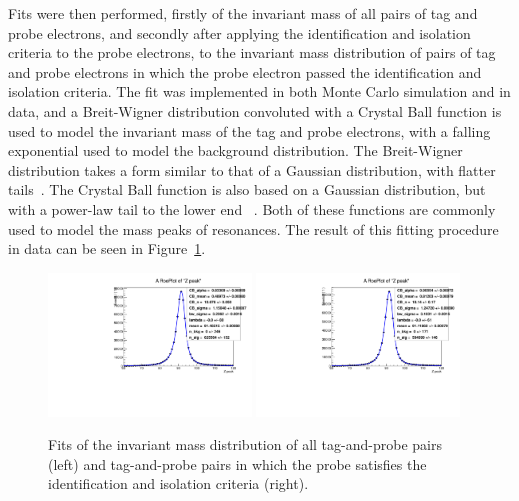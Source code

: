 Fits were then performed, firstly of the invariant mass of all pairs of tag and probe electrons, and secondly
after applying the identification and isolation criteria to the probe electrons, to the invariant mass
distribution of pairs of tag and probe electrons in which the probe electron passed the identification and
isolation criteria. The fit was implemented in both Monte Carlo simulation and in data, and a Breit-Wigner
distribution convoluted with a Crystal Ball function is used to model the invariant mass of the tag and probe
electrons, with a falling exponential used to model the background distribution. The Breit-Wigner distribution
takes a form similar to that of a Gaussian distribution, with flatter tails~\cite{PhysRev.49.519}. The Crystal
Ball function is also based on a Gaussian distribution, but with a power-law tail to the lower end
~\cite{Oreglia,Gaiser,Skwarnicki}. Both of these functions are commonly used to model the mass peaks of
resonances. The result of this fitting procedure in data can be seen in
Figure~\ref{fig:electron_id_iso_efficiency_invariant_Z_mass_fits_data}.

\begin{figure}[hbtp]
    \centering
      \includegraphics[width=0.48\textwidth]{Chapters/04_Analysis/04b_XSections/images/lepton_scale_factors/CBConvolution/electron/data/id_iso/tagProbe_total_Z_peak}\hfill
      \includegraphics[width=0.48\textwidth]{Chapters/04_Analysis/04b_XSections/images/lepton_scale_factors/CBConvolution/electron/data/id_iso/tagProbe_passed_Z_peak}\\
     \caption[Fits of the invariant mass distribution of all tag-and-probe pairs and tag-and-probe pairs in
     which the probe satisfies the identification and isolation criteria.]{Fits of the invariant mass
     distribution of all tag-and-probe pairs (left) and tag-and-probe pairs in which the probe satisfies
     the identification and isolation criteria (right).}
     \label{fig:electron_id_iso_efficiency_invariant_Z_mass_fits_data}
\end{figure}

